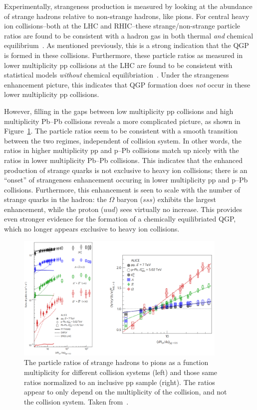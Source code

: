 Experimentally, strangeness production is measured by looking at the abundance of strange hadrons relative to non-strange hadrons, like pions. For central heavy ion collisions--both at the LHC and RHIC--these strange/non-strange particle ratios are found to be consistent with a hadron gas in both thermal \textit{and} chemical equilibrium~\cite{NATURE12, NATURE13}. As mentioned previously, this is a strong indication that the QGP is formed in these collisions. Furthermore, these particle ratios as measured in lower multiplicity pp collisions at the LHC are found to be consistent with statistical models \textit{without} chemical equilibriation~\cite{NATURE14, NATURE15}. Under the strangeness enhancement picture, this indicates that QGP formation does \textit{not} occur in these lower multiplicity pp collisions. 

 However, filling in the gaps between low multiplicity pp collisions and high multiplicity Pb--Pb collisions reveals a more complicated picture, as shown in Figure~\ref{fig:strangeness_enhancement}. The particle ratios seem to be consistent with a smooth transition between the two regimes, independent of collision system. In other words, the ratios in higher multiplicity pp and p--Pb collisions match up nicely with the ratios in lower multiplicity Pb--Pb collisions. This indicates that the enhanced production of strange quarks is not exclusive to heavy ion collisions; there is an ``onset'' of strangeness enhancement occuring in lower multiplicity pp and p--Pb collisions. Furthermore, this enhancement is seen to scale with the number of strange quarks in the hadron: the $\Omega$ baryon ($sss$) exhibits the largest enhancement, while the proton ($uud$) sees virtually no increase. This provides even stronger evidence for the formation of a chemically equilibriated QGP, which no longer appears exclusive to heavy ion collisions.

 \begin{figure}
    \centering
    \includegraphics[width=0.9\textwidth]{figures/introduction/strangeness_enhancement.png}
    \caption{The particle ratios of strange hadrons to pions as a function multiplicity for different collision systems (left) and those same ratios normalized to an inclusive pp sample (right). The ratios appear to only depend on the multiplicity of the collision, and not the collision system. Taken from~\cite{NATURE}.}
    \label{fig:strangeness_enhancement}
\end{figure}
 
